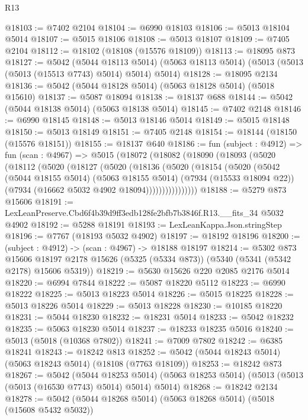 \begin{lexlean}{R13}
\begin{coremodule}
@18103 := @7402 @2104
@18104 := @6990 @18103
@18106 := @5013 @18104 @5014
@18107 := @5015 @18106
@18108 := @5013 @18107
@18109 := @7405 @2104
@18112 := @18102 (@18108 (@15576 @18109))
@18113 := @18095 @873
@18127 := @5042
    (@5044 @18113 @5014)
    (@5063 @18113 @5014)
    (@5013 (@5013 (@5013 (@15513 @7743) @5014) @5014) @5014)
@18128 := @18095 @2134
@18136 := @5042 (@5044 @18128 @5014) (@5063 @18128 @5014) (@5018 @15610)
@18137 := @5087 @18094
@18138 := @18137 @688
@18144 := @5042 (@5044 @18138 @5014) (@5063 @18138 @5014)
@18145 := @7402 @2148
@18146 := @6990 @18145
@18148 := @5013 @18146 @5014
@18149 := @5015 @18148
@18150 := @5013 @18149
@18151 := @7405 @2148
@18154 := @18144 (@18150 (@15576 @18151))
@18155 := @18137 @640
@18186 := fun (subject : @4912) =>
  fun (scan : @4967) =>
  @5015
    (@18072
      (@18082
        (@18090
          (@18093
            (@5020
              (@18112
                (@5020
                  (@18127
                    (@5020
                      (@18136
                        (@5020
                          (@18154
                            (@5020
                              (@5042
                                (@5044 @18155 @5014)
                                (@5063 @18155 @5014)
                                (@7934 (@15533 @18094 @22))
                                (@7934 (@16662 @5032 @4902 @18094))))))))))))))))
@18188 := @5279 @873 @15606
@18191 := LexLeanPreserve.Cbd6f4b39d9ff3edb128fe2bfb7b3846f.R13.__fits_34 @5032 @4902
@18192 := @5288 @18191
@18193 := LexLeanKappa.Json.stringStep
@18196 := @7767 (@18193 @5032 @4902)
@18197 := @18192 @18196
@18200 := (subject : @4912) -> (scan : @4967) -> @18188 @18197
@18214 := @5302
    @873
    @15606
    @18197
    @2178
    @15626
    (@5325 (@5334 @873))
    (@5340 (@5341 (@5342 @2178) @15606 @5319))
@18219 := @5630 @15626 @220 @2085 @2176 @5014
@18220 := @6994 @7844
@18222 := @5087 @18220 @5112
@18223 := @6990 @18222
@18225 := @5013 @18223 @5014
@18226 := @5015 @18225
@18228 := @5013 @18226 @5014
@18229 := @5013 @18228
@18230 := @10185 @18220
@18231 := @5044 @18230
@18232 := @18231 @5014
@18233 := @5042 @18232
@18235 := @5063 @18230 @5014
@18237 := @18233 @18235 @5016
@18240 := @5013 (@5018 (@10368 @7802))
@18241 := @7009 @7802
@18242 := @6385 @18241
@18243 := @18242 @813
@18252 := @5042 (@5044 @18243 @5014) (@5063 @18243 @5014) (@18108 (@7763 @18109))
@18253 := @18242 @873
@18267 := @5042
    (@5044 @18253 @5014)
    (@5063 @18253 @5014)
    (@5013 (@5013 (@5013 (@16530 @7743) @5014) @5014) @5014)
@18268 := @18242 @2134
@18278 := @5042 (@5044 @18268 @5014) (@5063 @18268 @5014) (@5018 (@15608 @5432 @5032))

\end{coremodule}
\end{lexlean}
